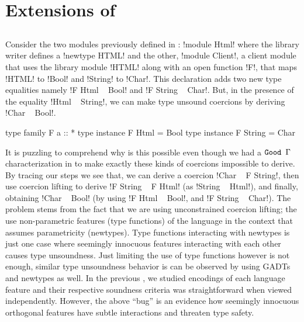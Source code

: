 \documentclass[manuscript,screen,nonacm]{acmart}
\begin{document}
\section{Extensions of \SFC}\label{sec:fc-extensions}%
\subsection{\SFR}\label{sec:sfr} %
Consider the two modules previously defined in : !module Html! where the library writer defines a !newtype HTML! and the other, !module Client!, a client module that uses the library module !HTML! along with an open function !F!, that maps !HTML! to !Bool! and !String! to !Char!. This declaration adds two new type equalities namely !F Html ~ Bool! and !F String ~ Char!. But, in the presence of the equality !Html ~ String!, we can make type unsound coercions by deriving !Char ~ Bool!.

\begin{CenteredBox}
  \begin{code}
    type family F a :: *
    type instance F Html = Bool
    type instance F String = Char
  \end{code}
\end{CenteredBox}

It is puzzling to comprehend why is this possible even though we had a $\texttt{Good~}\Gamma$ characterization in  to make exactly these kinds of coercions impossible to derive. By tracing our steps we see that, we can derive a coercion !Char ~ F String!, then use coercion lifting to derive !F String ~ F Html! (as !String ~ Html!), and finally, obtaining !Char ~ Bool! (by using !F Html ~ Bool!, and !F String ~ Char!). The problem stems from the fact that we are using unconstrained coercion lifting; the use non-parametric features (type functions) of the language in the context that assumes parametricity (newtypes). Type functions interacting with newtypes is just one case where seemingly innocuous features interacting with each other causes type unsoundness. Just limiting the use of type functions however is not enough, similar type unsoundness behavior is can be observed by using GADTs and newtypes as well\cite{weirich_generative_2011}. In the previous , we studied \SFC encodings of each language feature and their respective soundness criteria was straightforward when viewed independently. However, the above ``bug'' is an evidence how seemingly innocuous orthogonal features have subtle interactions and threaten type safety.
\end{document}
